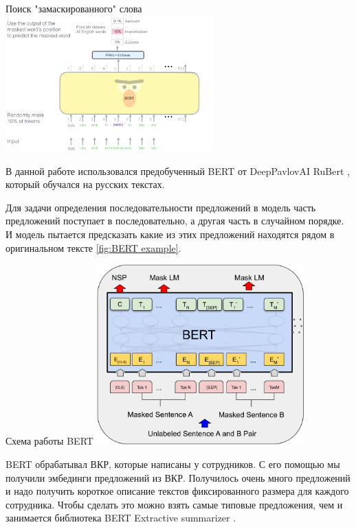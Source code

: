 \documentclass[PI,KR]{HSEUniversity}
\begin{document}
\begin{FIGURE}[h]{Поиск "замаскированного" слова \label{fig:BERT illustrated}}
	\includegraphics[width=0.6\textwidth]{img/BERT illustrated}
\end{FIGURE}

В данной работе использовался предобученный BERT от DeepPavlovAI RuBert \cite{kuratov2019adaptation}, который обучался на русских текстах. 

Для задачи определения последовательности предложений в модель часть предложений поступает в последовательно, а другая часть в случайном порядке. И модель пытается предсказать какие из этих предложений находятся рядом в оригинальном тексте \ref{fig:BERT example}.

\begin{FIGURE}[h]{Схема работы BERT \label{fig:BERT example}}
	\includegraphics[width=0.6\textwidth]{img/BERT example}
\end{FIGURE}

BERT обрабатывал ВКР, которые написаны у сотрудников. С его помощью мы получили эмбединги предложений из ВКР. Получилось очень много предложений и надо получить короткое описание текстов фиксированного размера для каждого сотрудника. Чтобы сделать это можно взять самые типовые предложения, чем и занимается библиотека BERT Extractive summarizer \cite{miller2019leveraging}. 
\end{document}
